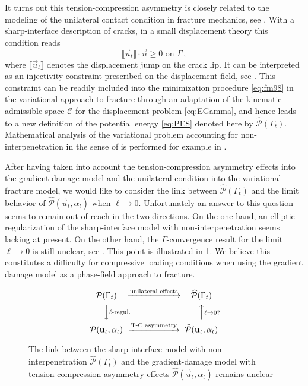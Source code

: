 It turns out this tension-compression asymmetry is closely related to the modeling of the unilateral contact condition in fracture mechanics, see \cite{AmorMarigoMaurini:2009}. With a sharp-interface description of cracks, in a small displacement theory this condition reads
\[
\llbracket\vec{u}_t\rrbracket\cdot\vec{n}\geq 0\text{ on $\Gamma$}\,,
\]
where $\llbracket\vec{u}_t\rrbracket$ denotes the displacement jump on the crack lip. It can be interpreted as an injectivity constraint prescribed on the displacement field, see \cite{CiarletNecas:1987}. This constraint can be readily included into the minimization procedure \eqref{eq:fm98} in the variational approach to fracture through an adaptation of the kinematic admissible space $\mathcal{C}$ for the displacement problem \eqref{eq:EGamma}, and hence leads to a new definition of the potential energy \eqref{eq:PES} denoted here by $\widehat{\mathcal{P}}(\Gamma_t)$. Mathematical analysis of the variational problem accounting for non-interpenetration in the sense of \cite{CiarletNecas:1987} is performed for example in \cite{MasoLazzaroni:2010}.

After having taken into account the tension-compression asymmetry effects into the gradient damage model and the unilateral condition into the variational fracture model, we would like to consider the link between $\widehat{\mathcal{P}}(\Gamma_t)$ and the limit behavior of $\widehat{\mathcal{P}}(\vec{u}_t,\alpha_t)$ when $\ell\to 0$. Unfortunately an answer to this question seems to remain out of reach in  the two directions. On the one hand, an elliptic regularization of the sharp-interface model with non-interpenetration seems lacking at present. On the other hand, the $\Gamma$-convergence result for the limit $\ell\to 0$ is still unclear, see \cite{AmorMarigoMaurini:2009,FreddiRoyer-Carfagni:2010}. This point is illustrated in \cref{fig:TCunilateral}. We believe this constitutes a difficulty for compressive loading conditions when using the gradient damage model as a phase-field approach to fracture.
\begin{figure}[htbp]
\centering
\[
\begin{CD}
\mathcal{P}(\Gamma_t) @>\text{unilateral effects}>> \widehat{\mathcal{P}}(\Gamma_t) \\
@VV\text{$\ell$-regul.}V @AA{\ell\to 0?}A \\
\mathcal{P}(\vec{u}_t,\alpha_t) @>\text{T-C asymmetry}>> \widehat{\mathcal{P}}(\vec{u}_t,\alpha_t)
\end{CD}
\]
\caption{The link between the sharp-interface model with non-interpenetration $\widehat{\mathcal{P}}(\Gamma_t)$ and the gradient-damage model with tension-compression asymmetry effects $\widehat{\mathcal{P}}(\vec{u}_t,\alpha_t)$ remains unclear} \label{fig:TCunilateral}
\end{figure}

